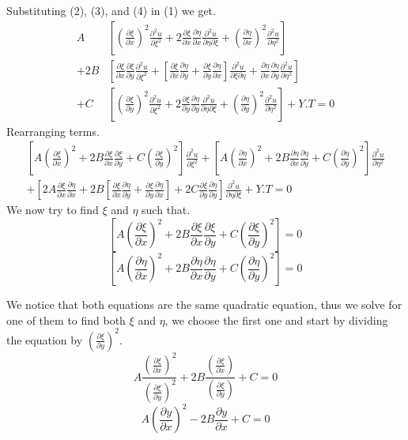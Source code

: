 \documentclass[]{article}
\begin{document}
Substituting (2), (3), and (4) in (1) we get.
\begin{align*}
       A&\left[{(\frac{\partial\xi}{\partial x})}^2\frac{\partial^2 u}{\partial\xi^2}+2\frac{\partial\xi}{\partial x}\frac{\partial\eta}{\partial x}\frac{\partial^2 u}{\partial\eta\partial\xi}+{(\frac{\partial\eta}{\partial x})}^2\frac{\partial^2 u}{\partial\eta^2}\right]
    \\ +2B&\left[\frac{\partial\xi}{\partial x}\frac{\partial\xi}{\partial y}\frac{\partial^2 u}{\partial\xi^2}+\left[\frac{\partial\xi}{\partial x}\frac{\partial\eta}{\partial y}+\frac{\partial\xi}{\partial y}\frac{\partial\eta}{\partial x}\right]\frac{\partial^2 u}{\partial\xi\partial\eta}+\frac{\partial\eta}{\partial x}\frac{\partial\eta}{\partial y}\frac{\partial^2 u}{\partial\eta^2}\right] 
    \\ +C&\left[{(\frac{\partial\xi}{\partial y})}^2\frac{\partial^2 u}{\partial\xi^2}+2\frac{\partial\xi}{\partial y}\frac{\partial\eta}{\partial y}\frac{\partial^2 u}{\partial\eta\partial\xi}+{(\frac{\partial\eta}{\partial y})}^2\frac{\partial^2 u}{\partial\eta^2}\right]+Y.T =0    
\end{align*}
\newpage
Rearranging terms.
\begin{align*}
\left[A{(\frac{\partial\xi}{\partial x})}^2+2B\frac{\partial\xi}{\partial x}\frac{\partial\xi}{\partial y}+C{(\frac{\partial\xi}{\partial y})}^2\right]\frac{\partial^2 u}{\partial\xi^2}+\left[A{(\frac{\partial\eta}{\partial x})}^2+2B\frac{\partial\eta}{\partial x}\frac{\partial\eta}{\partial y}+C{(\frac{\partial\eta}{\partial y})}^2\right]\frac{\partial^2 u}{\partial\eta^2}\\
+\left[2A\frac{\partial\xi}{\partial x}\frac{\partial\eta}{\partial x}+2B\left[\frac{\partial\xi}{\partial x}\frac{\partial\eta}{\partial y}+\frac{\partial\xi}{\partial y}\frac{\partial\eta}{\partial x}\right]+2C\frac{\partial\xi}{\partial y}\frac{\partial\eta}{\partial y}\right]\frac{\partial^2 u}{\partial\eta\partial\xi}+Y.T=0
\end{align*}
We now try to find $\xi$ and $\eta$ such that.
\[
    \left[A{(\frac{\partial\xi}{\partial x})}^2+2B\frac{\partial\xi}{\partial x}\frac{\partial\xi}{\partial y}+C{(\frac{\partial\xi}{\partial y})}^2\right] =0    
\]
\[
    \left[A{(\frac{\partial\eta}{\partial x})}^2+2B\frac{\partial\eta}{\partial x}\frac{\partial\eta}{\partial y}+C{(\frac{\partial\eta}{\partial y})}^2\right]=0    
\]

We notice that both equations are the same quadratic equation, thus we solve for one of them to find both $\xi$ and $\eta$, we choose the first one and start by dividing the equation by $\displaystyle {\left(\frac{\partial\xi}{\partial y}\right)}^2$.
\[
    A\frac{{(\frac{\partial\xi}{\partial x})}^2}{{(\frac{\partial\xi}{\partial y})}^2}+2B\frac{\left(\frac{\partial\xi}{\partial x}\right)}{\left(\frac{\partial\xi}{\partial y}\right)}+C =0    
\]
\[
    A{(\frac{\partial y}{\partial x})}^2-2B\frac{\partial y}{\partial x}+C =0    
\]
\end{document}
